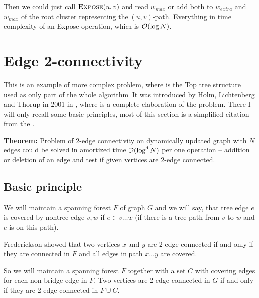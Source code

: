 Then we could just call $\hbox{\sc Expose}(u,v)$ and read $w_{max}$ or add both to
$w_{extra}$ and $w_{max}$ of the root cluster representing the $(u,v)$-path.
Everything in time complexity of an {\sc Expose} operation, which is ${\cal O}(\log
N)$.




\section{Edge 2-connectivity}
\label{sec:edge_2_connectivity}

This is an example of more complex problem, where is the Top tree structure used
as only part of the whole algorithm. It was introduced by Holm, Lichtenberg and
Thorup in 2001 in \cite{PolylogarithmicAlgorithmsForConnectivity}, where is a
complete elaboration of the problem. There I will only recall some basic
principles, most of this section is a simplified citation from the
\cite{PolylogarithmicAlgorithmsForConnectivity}.

\noindent
{\bf Theorem:} Problem of 2-edge connectivity on dynamically updated graph with
$N$ edges could be solved in amortized time ${\cal O}(\log^4 N)$ per one operation --
addition or deletion of an edge and test if given vertices are 2-edge connected.

\subsection{Basic principle}

We will maintain a spanning forest $F$ of graph $G$ and we will say, that tree
edge $e$ is {\I covered} by nontree edge $v,w$ if $e \in v\dots w$ (if there is
a tree path from $v$ to $w$ and $e$ is on this path).

Frederickson showed that two vertices $x$ and $y$ are 2-edge connected if and
only if they are connected in $F$ and all edges in path $x\dots y$ are covered.

So we will maintain a spanning forest $F$ together with a set $C$ with covering
edges for each non-bridge edge in $F$. Two vertices are 2-edge connected in $G$
if and only if they are 2-edge connected in $F\cup C$.

